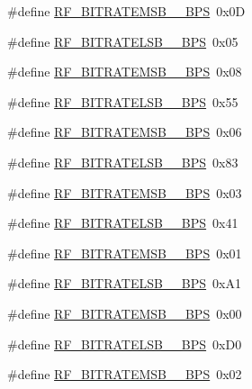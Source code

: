 \begin{DoxyCompactItemize}
\#define \mbox{\hyperlink{sx1276_regs-_fsk_8h_ae69250b1621744d9da30c06f56d0f483}{R\+F\+\_\+\+B\+I\+T\+R\+A\+T\+E\+M\+S\+B\+\_\+\_\+\+B\+PS}}~0x0D
\item 
\#define \mbox{\hyperlink{sx1276_regs-_fsk_8h_ad137bc838a75f376cf1b9be4f53e6eb7}{R\+F\+\_\+\+B\+I\+T\+R\+A\+T\+E\+L\+S\+B\+\_\+\_\+\+B\+PS}}~0x05
\item 
\#define \mbox{\hyperlink{sx1276_regs-_fsk_8h_a1e8f56770ecc5d5f7264a7029f7ae2c3}{R\+F\+\_\+\+B\+I\+T\+R\+A\+T\+E\+M\+S\+B\+\_\+\_\+\+B\+PS}}~0x08
\item 
\#define \mbox{\hyperlink{sx1276_regs-_fsk_8h_a60340fe3a748b8e02ed6ebbf2426d620}{R\+F\+\_\+\+B\+I\+T\+R\+A\+T\+E\+L\+S\+B\+\_\+\_\+\+B\+PS}}~0x55
\item 
\#define \mbox{\hyperlink{sx1276_regs-_fsk_8h_aeec19a1a2418cf8ed29ac2ce61ebbe76}{R\+F\+\_\+\+B\+I\+T\+R\+A\+T\+E\+M\+S\+B\+\_\+\_\+\+B\+PS}}~0x06
\item 
\#define \mbox{\hyperlink{sx1276_regs-_fsk_8h_a4f1ddd00d5777887dc4b68b3711df3c9}{R\+F\+\_\+\+B\+I\+T\+R\+A\+T\+E\+L\+S\+B\+\_\+\_\+\+B\+PS}}~0x83
\item 
\#define \mbox{\hyperlink{sx1276_regs-_fsk_8h_a041c9eb73ab4c25e3ed8a25303a49ad0}{R\+F\+\_\+\+B\+I\+T\+R\+A\+T\+E\+M\+S\+B\+\_\+\_\+\+B\+PS}}~0x03
\item 
\#define \mbox{\hyperlink{sx1276_regs-_fsk_8h_a71ea2cd6143ebf9bf63a7118064a471f}{R\+F\+\_\+\+B\+I\+T\+R\+A\+T\+E\+L\+S\+B\+\_\+\_\+\+B\+PS}}~0x41
\item 
\#define \mbox{\hyperlink{sx1276_regs-_fsk_8h_a8e3881281736c31ce8b72b51e801b49d}{R\+F\+\_\+\+B\+I\+T\+R\+A\+T\+E\+M\+S\+B\+\_\+\_\+\+B\+PS}}~0x01
\item 
\#define \mbox{\hyperlink{sx1276_regs-_fsk_8h_ae22ca1c6a214c62d298eb1f6d76ba092}{R\+F\+\_\+\+B\+I\+T\+R\+A\+T\+E\+L\+S\+B\+\_\+\_\+\+B\+PS}}~0x\+A1
\item 
\#define \mbox{\hyperlink{sx1276_regs-_fsk_8h_a68aec0128102e04f2699befbf244f5ec}{R\+F\+\_\+\+B\+I\+T\+R\+A\+T\+E\+M\+S\+B\+\_\+\_\+\+B\+PS}}~0x00
\item 
\#define \mbox{\hyperlink{sx1276_regs-_fsk_8h_a918d453d557cfd2e89c2310591290ef6}{R\+F\+\_\+\+B\+I\+T\+R\+A\+T\+E\+L\+S\+B\+\_\+\_\+\+B\+PS}}~0x\+D0
\item 
\#define \mbox{\hyperlink{sx1276_regs-_fsk_8h_a5c8867e729d049e6b01d95f17daeaa43}{R\+F\+\_\+\+B\+I\+T\+R\+A\+T\+E\+M\+S\+B\+\_\+\_\+\+B\+PS}}~0x02
\item 

\end{DoxyCompactItemize}
